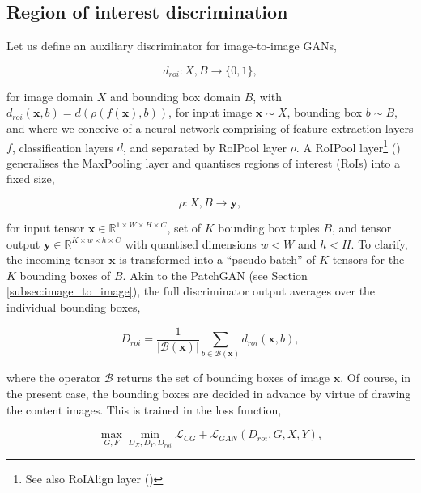 \subsection{Region of interest discrimination}

Let us define an auxiliary discriminator for image-to-image GANs,

\begin{equation}
d_{roi} : X, B \to \{0, 1\},
\end{equation}

for image domain $X$ and bounding box domain $B$, with $d_{roi}(\mathbf{x}, b) = d(\rho(f(\mathbf{x}), b))$, for input image $\mathbf{x} \sim X$, bounding box $b \sim B$, and where we conceive of a neural network comprising of feature extraction layers $f$, classification layers $d$, and separated by RoIPool layer $\rho$. A RoIPool layer\footnote{See also RoIAlign layer (\cite{he2017mask})} (\cite{girshick2015fast}) generalises the MaxPooling layer and quantises regions of interest (RoIs) into a fixed size,

\begin{equation}
\rho : X, B \to \mathbf{y},
\end{equation}

for input tensor $\mathbf{x} \in \mathbb{R}^{1\times W \times H \times C}$, set of $K$ bounding box tuples $B$, and tensor output $\mathbf{y} \in \mathbb{R}^{K \times w \times h \times C}$ with quantised dimensions $w < W$ and $h < H$. To clarify, the incoming tensor $\mathbf{x}$ is transformed into a ``pseudo-batch'' of $K$ tensors for the $K$ bounding boxes of $B$. Akin to the PatchGAN (see Section \ref{subsec:image_to_image}), the full discriminator output averages over the individual bounding boxes,

\begin{equation}
D_{roi} = \frac{1}{|\mathcal{B}(\mathbf{x})|}\sum_{b \in \mathcal{B}(\mathbf{x})} d_{roi}(\mathbf{x}, b),
\end{equation}

where the operator $\mathcal{B}$ returns the set of bounding boxes of image $\mathbf{x}$. Of course, in the present case, the bounding boxes are decided in advance by virtue of drawing the content images. This is trained in the loss function,

\begin{equation}
\max_{G, F}\min_{D_X, D_Y, D_{roi}} \mathcal{L}_{CG} + \mathcal{L}_{GAN}(D_{roi}, G, X, Y),
\end{equation}

